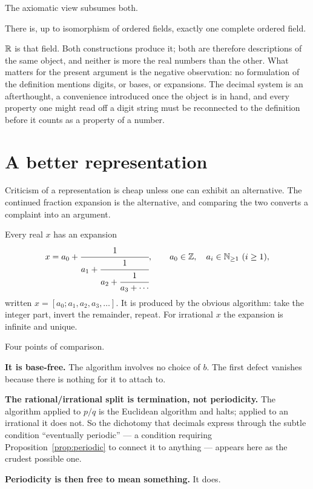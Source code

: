 \documentclass{essay}
\begin{document}
The axiomatic view subsumes both.

\begin{theorem}
  There is, up to isomorphism of ordered fields, exactly one complete ordered
  field.
\end{theorem}

\(\mathbb{R}\) is that field. Both constructions produce it; both are therefore
descriptions of the same object, and neither is more the real numbers than the
other. What matters for the present argument is the negative observation: no
formulation of the definition mentions digits, or bases, or expansions. The
decimal system is an afterthought, a convenience introduced once the object is
in hand, and every property one might read off a digit string must be
reconnected to the definition before it counts as a property of a number.

\section{A better representation}

Criticism of a representation is cheap unless one can exhibit an alternative.
The continued fraction expansion is the alternative, and comparing the two
converts a complaint into an argument.

Every real \(x\) has an expansion
\[ x = a_{0} + \cfrac{1}{a_{1} + \cfrac{1}{a_{2} + \cfrac{1}{a_{3} + \dotsb}}}, \qquad a_{0} \in \mathbb{Z}, \quad a_{i} \in \mathbb{N}_{\ge 1} \ (i \ge 1), \]
written \(x = [a_{0}; a_{1}, a_{2}, a_{3}, \ldots]\). It is produced by the obvious
algorithm: take the integer part, invert the remainder, repeat. For irrational
\(x\) the expansion is infinite and unique.

Four points of comparison.

\medskip
\noindent\textbf{It is base-free.} The algorithm involves no choice of \(b\). The
first defect vanishes because there is nothing for it to attach to.

\medskip
\noindent\textbf{The rational/irrational split is termination, not
periodicity.} The algorithm applied to \(p/q\) is the Euclidean algorithm and
halts; applied to an irrational it does not. So the dichotomy that decimals
express through the subtle condition ``eventually periodic'' --- a condition
requiring Proposition~\ref{prop:periodic} to connect it to anything --- appears
here as the crudest possible one.

\medskip
\noindent\textbf{Periodicity is then free to mean something.} It does.
\end{document}
